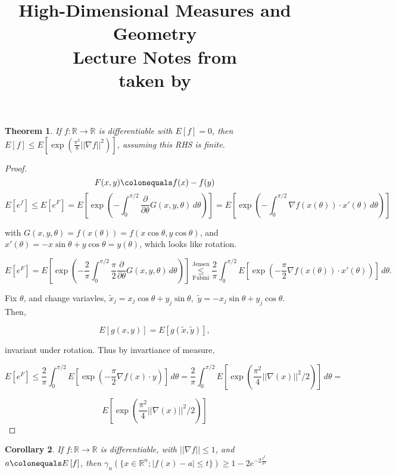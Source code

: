 \documentclass[12pt]{article}
\date{} %
\author{} %
\title{{\bf High-Dimensional Measures and Geometry}\\
Lecture Notes from \lecdat\\[0.1cm] \small taken by \notesby}
\newtheorem{thm}{Theorem}[section]
\newtheorem{cor}[thm]{Corollary}
\theoremstyle{remark}
\newcommand{\reals}[0] { \mathbb{R}}
\newcommand{\rarw}[0] { \rightarrow }
\newcommand{ \defeq }[0] { \colonequals }
\newcommand{ \Ex }[1] { E\left[ #1 \right ] }
\begin{document}
\maketitle


\begin{thm} 

If $f: \reals \rarw \reals$ is differentiable with $\Ex{f} = 0$, then $\Ex{f} \le \Ex{\exp(\frac{\pi^2}{8} || \nabla f || ^2)}$, assuming this RHS is finite. 

\end{thm}


\begin{proof} 

$$
    F(x,y) \defeq f(x) - f(y)
$$
$$
    \Ex{e^f} \le \Ex{e^F} = \Ex{\exp\left( - \int_0^{\pi/2} \frac{\partial}{\partial \theta} G(x,y,\theta) \, d\theta    \right)} =
     \Ex{\exp\left( - \int_0^{\pi/2}    \nabla f(x(\theta)) \cdot x'(\theta)      \, d\theta    \right)}
$$

\noindent
with $G(x,y,\theta) = f(x(\theta)) = f(x \cos \theta, y \cos \theta )$, and $x'(\theta) = -x \sin \theta + y \cos \theta = y(\theta)$, which looks like rotation.

$$
\Ex{e^F} = \Ex{ \exp \left( -\frac{2}{\pi} \int_0^{\pi/2} \frac{\pi}{2} \frac{\partial}{\partial \theta} G(x,y, \theta) \, d\theta \right) } \overset{\textrm{Jensen}}{ \underset{\textrm{Fubini}}{\le} }
\frac{2}{\pi}  \int_0^{\pi/2} \Ex{ \exp \left( - \frac{\pi}{2} \nabla f(x(\theta)) \cdot x'(\theta)   \right) } \, d\theta.
$$

\noindent
Fix $\theta$, and change variavles, $\tilde{x}_j = x_j \cos \theta + y_j \sin \theta,$ $\tilde{y} = -x_j \sin \theta + y_j \cos \theta$. Then,

$$
\Ex{ g(x,y) } = \Ex{ g( \tilde{x}, \tilde{y} )  },
$$

\noindent
invariant under rotation. Thus by invartiance of measure, 

$$
\Ex{ e^F } \le \frac{2}{\pi} \int_0^{\pi/2} \Ex{ \exp \left( - \frac{\pi}{2} \nabla f(x) \cdot y\right) } \, d\theta = 
 \frac{2}{\pi} \int_0^{\pi/2} \Ex{ \exp \left( \frac{\pi^2} {4} || \nabla (x) || ^2 / 2 \right) } \,d\theta = 
$$

$$
 \Ex{ \exp\left(\frac{\pi^2} {4} || \nabla (x) || ^2 / 2 \right) }
$$

\end{proof}



\begin{cor}

If $f: \reals \rarw \reals$ is differentiable, with $|| \nabla f || \le 1$, and $a \defeq \Ex{f}$, then $\gamma_n\left( \{ x \in \reals^n; |f(x) - a| \le t\} \right) \ge 1 - 2 e^{-2 \frac{t^2}{\pi^2}}$

\end{cor}
\end{document}
